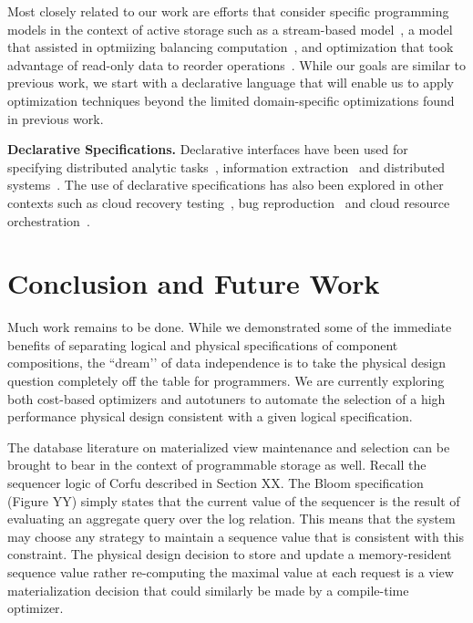 \documentclass[10pt,twocolumn]{article}
\begin{document}
Most closely related to our work are efforts that consider specific
programming models in the context of active storage such as a stream-based
model~\cite{acharya:asplos98}, a model that assisted in optmiizing balancing
computation~\cite{wickremesinghe:hpdc022}, and optimization that took
advantage of read-only data to reorder operations~\cite{huston:fast04}.
While our goals are similar to previous work, we start with a declarative
language that will enable us to apply optimization techniques beyond
the limited domain-specific optimizations found in previous work.

{\bf Declarative Specifications.}
Declarative interfaces have been used for specifying distributed analytic 
tasks~\cite{olston_pig_2008,thusoo_hive_2010}, information 
extraction~\cite{shen_declarative_2007} and distributed 
systems~\cite{conway_logic_2012,bauer_legion_2014}. The use of declarative 
specifications has also been explored in other contexts such as cloud recovery 
testing~\cite{gunawi_fate_2011}, bug reproduction~\cite{li_reprolite_2014} and 
cloud resource orchestration~\cite{liu_declarative_2011}.

\section{Conclusion and Future Work}

Much work remains to be done.  While we demonstrated some of the immediate
benefits of separating logical and physical specifications of component
compositions, the ``dream’’ of data independence is to take the physical
design question completely off the table for programmers.  We are currently
exploring both cost-based optimizers and autotuners to automate the selection
of a high performance physical design consistent with a given logical
specification.  

The database literature on materialized view maintenance and selection can be
brought to bear in the context of programmable storage as well.  Recall the
sequencer logic of Corfu described in Section XX.  The Bloom specification
(Figure YY) simply states that the current value of the sequencer is the
result of evaluating an aggregate query over the log relation.  This means
that the system may choose any strategy to maintain a sequence value that is
consistent with this constraint.  The physical design decision to store and
update a memory-resident sequence value rather re-computing the maximal value
at each request is a view materialization decision that could similarly be
made by a compile-time optimizer.
\end{document}
